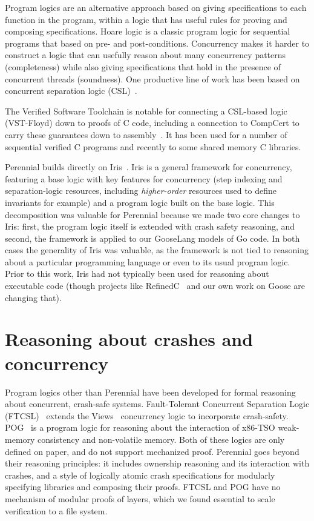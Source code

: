 Program logics are an alternative approach based on giving specifications to
each function in the program, within a logic that has useful rules for proving
and composing specifications. Hoare logic is a classic program
logic for sequential programs that based on pre- and post-conditions.
Concurrency makes it harder to construct a logic that can usefully reason about
many concurrency patterns (completeness) while also giving specifications that
hold in the presence of concurrent threads (soundness). One productive line of
work has been based on concurrent separation logic (CSL)~\cite{brookes:csl}.

The Verified Software Toolchain is notable for connecting a CSL-based logic
(VST-Floyd) down to proofs of C code, including a connection to CompCert to
carry these guarantees down to assembly~\cite{cao:vst-floyd}. It has been used
for a number of sequential verified C programs and recently to some shared
memory C libraries.

Perennial builds directly on Iris~\cite{jung:iris-jfp}. Iris is a general
framework for concurrency, featuring a base logic with key features for
concurrency (step indexing and separation-logic resources, including
\emph{higher-order} resources used to define invariants for example) and a
program logic built on the base logic. This decomposition was valuable for
Perennial because we made two core changes to Iris: first, the program logic
itself is extended with crash safety reasoning, and second, the framework is
applied to our GooseLang models of Go code. In both cases the generality of Iris
was valuable, as the framework is not tied to reasoning about a particular
programming language or even to its usual program logic. Prior to this work,
Iris had not typically been used for reasoning about executable code (though
projects like RefinedC~\cite{sammler:refinedc} and our own work on Goose are
changing that).

\section{Reasoning about crashes and concurrency}
\label{sec:rel:crashes-concurrency}

Program logics other than Perennial have been developed for formal reasoning
about concurrent, crash-safe systems. Fault-Tolerant Concurrent Separation Logic
(FTCSL)~\cite{ntzik:faults} extends the Views~\cite{dinsdale:views} concurrency
logic to incorporate crash-safety. POG~\cite{raad:pog} is a program logic for
reasoning about the interaction of x86-TSO weak-memory consistency and
non-volatile memory. Both of these logics are only defined on paper, and do not
support mechanized proof. Perennial goes beyond their reasoning principles: it
includes ownership reasoning and its interaction with crashes, and a style of
logically atomic crash specifications for modularly specifying libraries and
composing their proofs. FTCSL and POG have no mechanism of modular proofs of
layers, which we found essential to scale verification to a file system.

